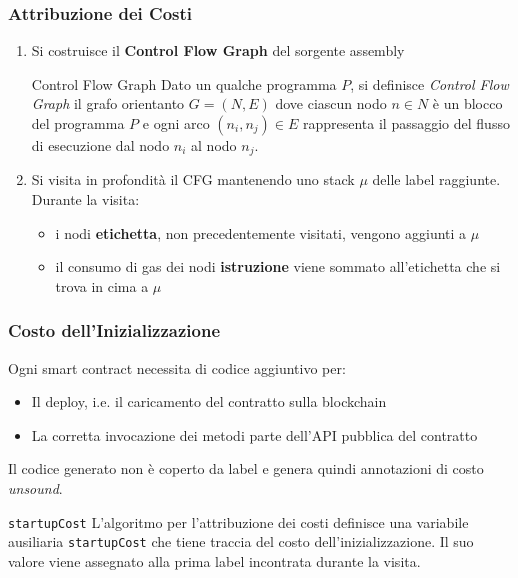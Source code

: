 \documentclass{beamer}
\begin{document}
\begin{frame}
    \frametitle{Attribuzione dei Costi}
    \begin{enumerate}
        \item
        Si costruisce il \textbf{Control Flow Graph} del sorgente assembly
        \begin{block}{Control Flow Graph}
        Dato un qualche programma $P$, si definisce \textit{Control Flow Graph} il grafo orientanto $G = (N,E)$ dove ciascun nodo $n \in N$ \`{e} un blocco del programma $P$ e ogni arco $(n_i,n_j) \in E$ rappresenta il passaggio del flusso di esecuzione dal nodo $n_i$ al nodo $n_j$.
        \end{block}
        \item
        Si visita in profondit\`{a} il CFG mantenendo uno stack $\mu$ delle label raggiunte. Durante la visita:
        \begin{itemize}
            \item i nodi \textbf{etichetta}, non precedentemente visitati, vengono aggiunti a $\mu$
            \item il consumo di gas dei nodi \textbf{istruzione} viene sommato all'etichetta che si trova in cima a $\mu$
        \end{itemize}
    \end{enumerate}
\end{frame}
\begin{frame}
    \frametitle{Costo dell'Inizializzazione}
    Ogni smart contract necessita di codice aggiuntivo per:
    \begin{itemize}
        \item Il deploy, i.e. il caricamento del contratto sulla blockchain
        \item La corretta invocazione dei metodi parte dell'API pubblica del contratto
    \end{itemize}
    Il codice generato non \`{e} coperto da label e genera quindi annotazioni di costo \textit{unsound}.
    \begin{block}{\texttt{startupCost}}
    L'algoritmo per l'attribuzione dei costi definisce una variabile ausiliaria \texttt{startupCost} che tiene traccia del costo dell'inizializzazione. Il suo valore viene assegnato alla prima label incontrata durante la visita.
    \end{block}
\end{frame}
\end{document}
